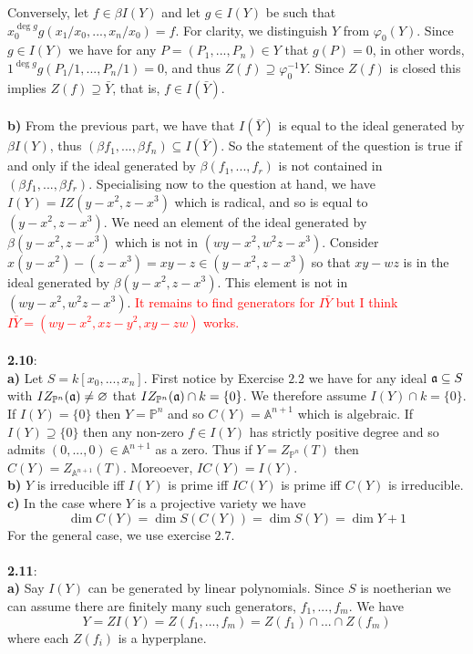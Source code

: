 \documentclass[12pt]{article}
\numberwithin{thm}{subsection}
\numberwithin{defn}{subsection}
\numberwithin{lemma}{subsection}
\numberwithin{example}{subsection}
\numberwithin{notation}{subsection}
\numberwithin{cor}{subsection}
\numberwithin{remark}{subsection}
\numberwithin{condition}{subsection}
\numberwithin{question}{subsection}
\numberwithin{construction}{subsection}
\numberwithin{construction}{subsection}
\numberwithin{construction}{subsection}
\newcommand{\bb}[1]{\mathbb{#1}}
\begin{document}
Conversely, let $f \in \beta I(Y)$ and let $g \in I(Y)$ be such that $x_0^{\operatorname{deg}g}g(x_1/x_0,...,x_n/x_0) = f$. For clarity, we distinguish $Y$ from $\varphi_0(Y)$. Since $g \in I(Y)$ we have for any $P = (P_1,...,P_n) \in Y$ that $g(P) = 0$, in other words, $1^{\operatorname{deg}g}g(P_1/1,...,P_n/1) = 0$, and thus $Z(f) \supseteq \varphi_0^{-1}Y$. Since $Z(f)$ is closed this implies $Z(f) \supseteq \bar{Y}$, that is, $f \in I(\bar{Y})$.\\\\
%
\textbf{b)} From the previous part, we have that $I(\bar{Y})$ is equal to the ideal generated by $\beta I(Y)$, thus $(\beta f_1,...,\beta f_n) \subseteq I(\bar{Y})$. So the statement of the question is true if and only if the ideal generated by $\beta (f_1,...,f_r)$ is not contained in $(\beta f_1,..., \beta f_r)$. Specialising now to the question at hand, we have $I(Y) = IZ(y - x^2, z - x^3)$ which is radical, and so is equal to $(y-x^2, z-x^3)$. We need an element of the ideal generated by $\beta (y - x^2, z - x^3)$ which is not in $(wy - x^2, w^2z - x^3)$. Consider $x(y - x^2) - (z - x^3) = xy - z \in (y - x^2, z - x^3)$ so that $xy - wz$ is in the ideal generated by $\beta (y - x^2, z-x^3)$. This element is not in $(wy - x^2, w^2z - x^3)$. \textcolor{red}{It remains to find generators for $I\bar{Y}$ but I think $I\bar{Y} = (wy-x^2, xz - y^2, xy - zw)$ works.}\\\\
%
\textbf{2.10}:\\
\textbf{a)} Let $S = k[x_0,...,x_n]$. First notice by Exercise $2.2$ we have for any ideal $\frak{a} \subseteq S$ with $IZ_{\bb{P}^n}(\frak{a}) \neq \varnothing$ that $IZ_{\bb{P}^n}(\frak{a}) \cap k = \lbrace 0 \rbrace $. We therefore assume $I(Y) \cap k = \lbrace 0 \rbrace$. If $I(Y) = \lbrace 0\rbrace$ then $Y = \bb{P}^n$ and so $C(Y) = \bb{A}^{n+1}$ which is algebraic. If $I(Y) \supseteq \lbrace 0 \rbrace$ then any non-zero $f \in I(Y)$ has strictly positive degree and so admits $(0,...,0) \in \bb{A}^{n+1}$ as a zero. Thus if $Y = Z_{\bb{P}^n}(T)$ then $C(Y) = Z_{\bb{A}^{n+1}}(T)$. Moreoever, $IC(Y) = I(Y)$.\\
\textbf{b)} $Y$ is irreducible iff $I(Y)$ is prime iff $IC(Y)$ is prime iff $C(Y)$ is irreducible.\\
\textbf{c)} In the case where $Y$ is a projective variety we have
\[\operatorname{dim}C(Y) = \operatorname{dim}S(C(Y)) = \operatorname{dim}S(Y) = \operatorname{dim}Y + 1\]
For the general case, we use exercise $2.7$.\\\\
%
\textbf{2.11}:\\
\textbf{a)} Say $I(Y)$ can be generated by linear polynomials. Since $S$ is noetherian we can assume there are finitely many such generators, $f_1,...,f_m$. We have
\[Y = ZI(Y) = Z(f_1,...,f_m) = Z(f_1) \cap ... \cap Z(f_m)\]
where each $Z(f_i)$ is a hyperplane.\\
\end{document}
